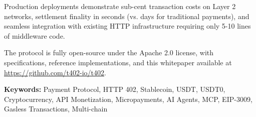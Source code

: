Production deployments demonstrate sub-cent transaction costs on Layer 2 networks, settlement finality in seconds (vs. days for traditional payments), and seamless integration with existing HTTP infrastructure requiring only 5-10 lines of middleware code.

The protocol is fully open-source under the Apache 2.0 license, with specifications, reference implementations, and this whitepaper available at \url{https://github.com/t402-io/t402}.

\vspace{1em}

\noindent\textbf{Keywords:} Payment Protocol, HTTP 402, Stablecoin, USDT, USDT0, Cryptocurrency, API Monetization, Micropayments, AI Agents, MCP, EIP-3009, Gasless Transactions, Multi-chain

